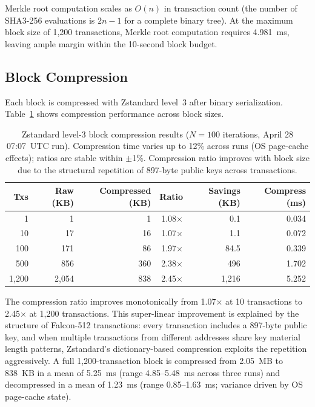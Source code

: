 \documentclass[11pt,a4paper]{article}
\begin{document}
Merkle root computation scales as $O(n)$ in transaction count (the number of
SHA3-256 evaluations is $2n - 1$ for a complete binary tree). At the maximum
block size of 1,200 transactions, Merkle root computation requires 4.981~ms,
leaving ample margin within the 10-second block budget.

\subsection{Block Compression}

Each block is compressed with Zstandard level~3 after binary serialization.
Table~\ref{tab:compress} shows compression performance across block sizes.

\begin{table}[h]
\centering
\small
\begin{tabular}{@{}rrrrrr@{}}
\toprule
\textbf{Txs} & \textbf{Raw (KB)} & \textbf{Compressed (KB)} & \textbf{Ratio} & \textbf{Savings (KB)} & \textbf{Compress (ms)} \\
\midrule
1    & 1   & 1   & 1.08$\times$ & 0.1   & 0.034 \\
10   & 17  & 16  & 1.07$\times$ & 1.1   & 0.072 \\
100  & 171 & 86  & 1.97$\times$ & 84.5  & 0.339 \\
500  & 856 & 360 & 2.38$\times$ & 496   & 1.702 \\
1,200 & 2,054 & 838 & 2.45$\times$ & 1,216 & 5.252 \\
\bottomrule
\end{tabular}
\caption{Zstandard level-3 block compression results ($N=100$ iterations,
April 28 07:07~UTC run). Compression time varies up to 12\% across runs
(OS page-cache effects); ratios are stable within $\pm$1\%. Compression ratio
improves with block size due to the structural repetition of 897-byte public
keys across transactions.}
\label{tab:compress}
\end{table}

The compression ratio improves monotonically from 1.07$\times$ at 10
transactions to 2.45$\times$ at 1,200 transactions. This super-linear
improvement is explained by the structure of Falcon-512 transactions: every
transaction includes a 897-byte public key, and when multiple transactions
from different addresses share key material length patterns, Zstandard's
dictionary-based compression exploits the repetition aggressively. A full
1,200-transaction block is compressed from 2.05~MB to 838~KB in a mean of 5.25~ms
(range 4.85--5.48~ms across three runs) and decompressed in a mean of 1.23~ms
(range 0.85--1.63~ms; variance driven by OS page-cache state).
\end{document}
